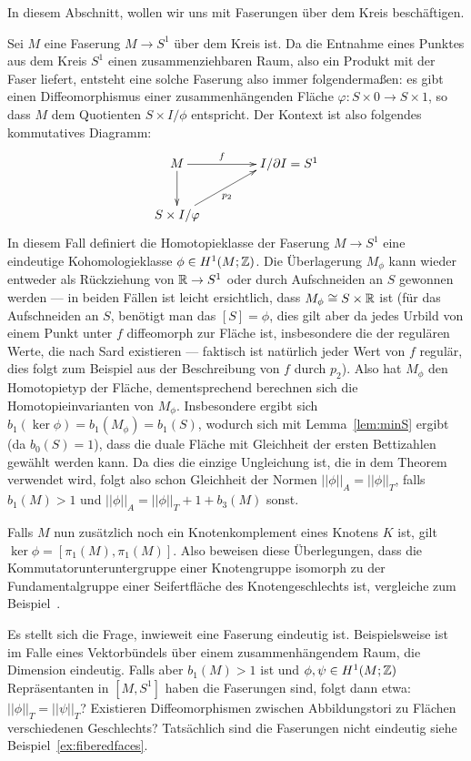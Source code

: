     In diesem Abschnitt, wollen wir uns mit Faserungen über dem Kreis beschäftigen.
        
    \begin{bsp}
    	Sei $M$ eine Faserung $M\to S^1$ über dem Kreis ist. Da die Entnahme eines Punktes aus dem Kreis $S^1$ einen zusammenziehbaren Raum, also ein Produkt mit der Faser liefert, entsteht eine solche Faserung also immer folgendermaßen: es gibt einen Diffeomorphismus einer zusammenhängenden Fläche $\varphi: S \times 0 \to S\times 1$, so dass $M$ dem Quotienten $S\times I/\phi$ entspricht. Der Kontext ist also folgendes kommutatives Diagramm:
    	\[
    		\begin{xy}
    			\xymatrix{M \ar[r]^f \ar[d] &**[r] I/\partial I = S^1 \\
    					S\times I /\varphi \ar[ru]_{p_2}}
    		\end{xy}
    	\]
    	In diesem Fall definiert die Homotopieklasse der Faserung $M \to S^1$ eine eindeutige Kohomologieklasse $\phi\in H^1(M;\mathbb{Z})$. Die Überlagerung $M_\phi$ kann wieder entweder als Rückziehung von $\mathbb{R} \to S^1$ oder durch Aufschneiden an $S$ gewonnen werden --- in beiden Fällen ist leicht ersichtlich, dass $M_\phi \cong S \times \mathbb{R}$ ist (für das Aufschneiden an $S$, benötigt man das $[S]=\phi$, dies gilt aber da jedes Urbild von einem Punkt unter $f$ diffeomorph zur Fläche ist, insbesondere die der regulären Werte, die nach Sard existieren --- faktisch ist natürlich jeder Wert von $f$ regulär, dies folgt zum Beispiel aus der Beschreibung von $f$ durch $p_2$). Also hat $M_\phi$ den Homotopietyp der Fläche, dementsprechend berechnen sich die Homotopieinvarianten von $M_\phi$. Insbesondere ergibt sich $b_1(\ker\phi) =b_1(M_\phi)= b_1(S)$, wodurch sich mit Lemma~\ref{lem:minS} ergibt (da $b_0(S)=1$), dass die duale Fläche mit Gleichheit der ersten Bettizahlen gewählt werden kann. Da dies die einzige Ungleichung ist, die in dem Theorem verwendet wird, folgt also schon Gleichheit der Normen $||\phi||_A = ||\phi||_T$, falls $b_1(M)>1$ und $||\phi||_A = ||\phi||_T+1+b_3(M)$ sonst.

        Falls $M$ nun zusätzlich noch ein Knotenkomplement eines Knotens $K$ ist, gilt $\ker\phi = [\pi_1(M),\pi_1(M)]$. Also beweisen diese Überlegungen, dass die Kommutatorunteruntergruppe einer Knotengruppe isomorph zu der Fundamentalgruppe einer Seifertfläche des Knotengeschlechts ist, vergleiche zum Beispiel~\cite[Theorem 4.6]{Burde.2003}.

        Es stellt sich die Frage, inwieweit eine Faserung eindeutig ist. Beispielsweise ist im Falle eines Vektorbündels über einem zusammenhängendem Raum, die Dimension eindeutig. Falls aber $b_1(M)>1$ ist und $\phi,\psi \in H^1(M;\mathbb{Z})$ Repräsentanten in $[M,S^1]$ haben die Faserungen sind, folgt dann etwa: $||\phi||_T=||\psi||_T$? Existieren Diffeomorphismen zwischen Abbildungstori zu Flächen verschiedenen Geschlechts? Tatsächlich sind die Faserungen nicht eindeutig siehe Beispiel~\ref{ex:fiberedfaces}.


\end{bsp}
